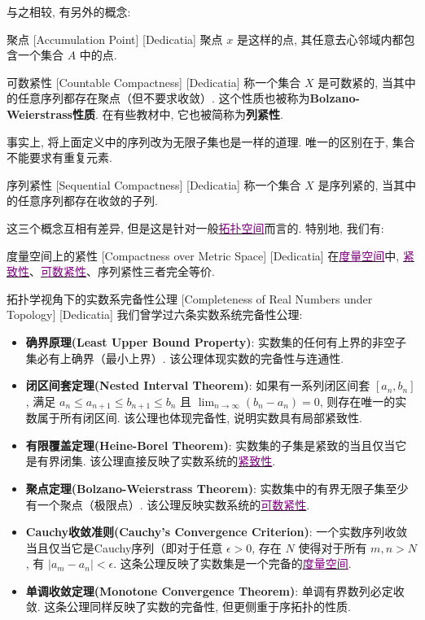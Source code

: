 \documentclass[UTF8]{ctexart}
\newcommand{\hyperrefc}[2]{\hyperref[#1]{\textcolor{purple}{#2}}}
\begin{document}
与之相较, 有另外的概念: 
\begin{dfn}
    [UUID]
    {聚点}
    [Accumulation Point]
    [Dedicatia]
    聚点 \( x \) 是这样的点, 其任意去心邻域内都包含一个集合 \( A \) 中的点. 
\end{dfn}
\begin{dfn}
    [CountableCompactness]
    {可数紧性}
    [Countable Compactness]
    [Dedicatia]
    称一个集合 \( X \) 是可数紧的, 当其中的任意序列都存在聚点（但不要求收敛）. 这个性质也被称为\textbf{Bolzano-Weierstrass性质}. 在有些教材中, 它也被简称为\textbf{列紧性}. 
\end{dfn}
事实上, 将上面定义中的序列改为无限子集也是一样的道理. 唯一的区别在于, 集合不能要求有重复元素. 
\begin{dfn}
    [UUID]
    {序列紧性}
    [Sequential Compactness]
    [Dedicatia]
    称一个集合 \( X \) 是序列紧的, 当其中的任意序列都存在收敛的子列. 
\end{dfn}
这三个概念互相有差异, 但是这是针对一般\hyperrefc{dfn:TopologicalSpace}{拓扑空间}而言的. 特别地, 我们有: 
\begin{thm}
    [UUID]
    {度量空间上的紧性}
    [Compactness over Metric Space]
    [Dedicatia]
    在\hyperrefc{dfn:MetricSpace}{度量空间}中, \hyperrefc{dfn:Compactness}{紧致性}、\hyperrefc{dfn:CountableCompactness}{可数紧性}、序列紧性三者完全等价. 
\end{thm}
\begin{xmp}
    [UUID]
    {拓扑学视角下的实数系完备性公理}
    [Completeness of Real Numbers under Topology]
    [Dedicatia]
    我们曾学过六条实数系统完备性公理: 
    \begin{itemize}
        \item \textbf{确界原理(Least Upper Bound Property)}: 实数集的任何有上界的非空子集必有上确界（最小上界）. 该公理体现实数的完备性与连通性. 
        \item \textbf{闭区间套定理(Nested Interval Theorem)}: 如果有一系列闭区间套 \([a_n, b_n]\), 满足 \(a_n \leq a_{n+1} \leq b_{n+1} \leq b_n\) 且 \(\lim_{n \to \infty} (b_n - a_n) = 0\), 则存在唯一的实数属于所有闭区间. 该公理也体现完备性, 说明实数具有局部紧致性. 
        \item \textbf{有限覆盖定理(Heine-Borel Theorem)}: 实数集的子集是紧致的当且仅当它是有界闭集. 该公理直接反映了实数系统的\hyperrefc{dfn:Compactness}{紧致性}. 
        \item \textbf{聚点定理(Bolzano-Weierstrass Theorem)}: 实数集中的有界无限子集至少有一个聚点（极限点）. 该公理反映实数系统的\hyperrefc{dfn:CountableCompactness}{可数紧性}. 
        \item \textbf{Cauchy收敛准则(Cauchy's Convergence Criterion)}: 一个实数序列收敛当且仅当它是Cauchy序列（即对于任意 \(\epsilon > 0\), 存在 \(N\) 使得对于所有 \(m, n > N\), 有 \(|a_m - a_n| < \epsilon\). 这条公理反映了实数集是一个完备的\hyperrefc{dfn:MetricSpace}{度量空间}. 
        \item \textbf{单调收敛定理(Monotone Convergence Theorem)}: 单调有界数列必定收敛. 这条公理同样反映了实数的完备性, 但更侧重于序拓扑的性质. 
    \end{itemize}
\end{xmp}
\end{document}
